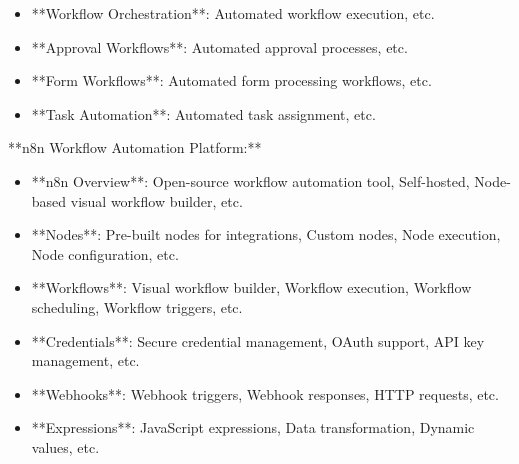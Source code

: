\documentclass[11pt,a4paper]{article}
\begin{document}
\begin{itemize}
\item **Workflow Orchestration**: Automated workflow execution, etc.
\end{itemize}

\begin{itemize}
\item **Approval Workflows**: Automated approval processes, etc.
\end{itemize}

\begin{itemize}
\item **Form Workflows**: Automated form processing workflows, etc.
\end{itemize}

\begin{itemize}
\item **Task Automation**: Automated task assignment, etc.
\end{itemize}

**n8n Workflow Automation Platform:**

\begin{itemize}
\item **n8n Overview**: Open-source workflow automation tool, Self-hosted, Node-based visual workflow builder, etc.
\end{itemize}

\begin{itemize}
\item **Nodes**: Pre-built nodes for integrations, Custom nodes, Node execution, Node configuration, etc.
\end{itemize}

\begin{itemize}
\item **Workflows**: Visual workflow builder, Workflow execution, Workflow scheduling, Workflow triggers, etc.
\end{itemize}

\begin{itemize}
\item **Credentials**: Secure credential management, OAuth support, API key management, etc.
\end{itemize}

\begin{itemize}
\item **Webhooks**: Webhook triggers, Webhook responses, HTTP requests, etc.
\end{itemize}

\begin{itemize}
\item **Expressions**: JavaScript expressions, Data transformation, Dynamic values, etc.
\end{itemize}
\end{document}
